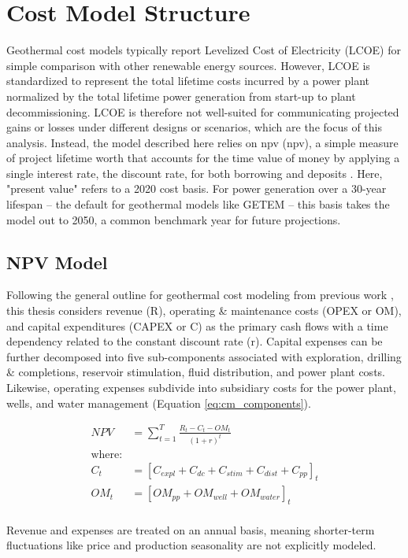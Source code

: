 \section{Cost Model Structure}
\label{ch4:cm_structure}

Geothermal cost models typically report Levelized Cost of Electricity (LCOE) for simple comparison with other renewable energy sources. However, LCOE is standardized to represent the total lifetime costs incurred by a power plant normalized by the total lifetime power generation from start-up to plant decommissioning. LCOE is therefore not well-suited for communicating projected gains or losses under different designs or scenarios, which are the focus of this analysis. Instead, the model described here relies on \acrlong{npv} (\acrshort{npv}), a simple measure of project lifetime worth that accounts for the time value of money by applying a single interest rate, the discount rate, for both borrowing and deposits \citep[p.\ 195-215]{de_neufville_flexibility_2011}. Here, "present value" refers to a 2020 cost basis. For power generation over a 30-year lifespan -- the default for geothermal models like GETEM \citep{entingh_volume_2006} -- this basis takes the model out to 2050, a common benchmark year for future projections. 

\subsection{NPV Model}
\label{ch4:cm_npv}
Following the general outline for geothermal cost modeling from previous work \citep[e.g.,][]{augustine_hydrothermal_2009, beckers_introducing_2013,tester_future_2006}, this thesis considers revenue (R), operating \& maintenance costs (OPEX or OM), and capital expenditures (CAPEX or C) as the primary cash flows with a time dependency related to the constant discount rate (r). Capital expenses can be further decomposed into five sub-components associated with exploration, drilling \& completions, reservoir stimulation, fluid distribution, and power plant costs. Likewise, operating expenses subdivide into subsidiary costs for the power plant, wells, and water management (Equation \ref{eq:cm_components}).

\begin{equation}
    \label{eq:cm_components}
    \begin{aligned}
    NPV &= \sum_{t=1}^{T}\frac{R_t - C_t - OM_t}{(1+r)^t}\\
    \text{where:}\\
    C_t &= \left[C_{expl} + C_{dc} + C_{stim} + C_{dist} + C_{pp}\right]_t\\
    OM_t &= \left[OM_{pp} + OM_{well} + OM_{water}\right]_t
    \end{aligned}
\end{equation}
\\
Revenue and expenses are treated on an annual basis, meaning shorter-term fluctuations like price and production seasonality are not explicitly modeled.

